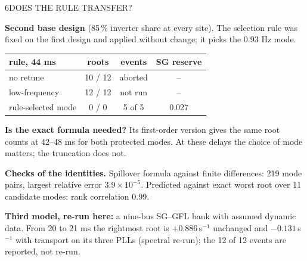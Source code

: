\begin{minipage}[t][\PosterMiddleRowHeight][t]{\PosterHalfWidth}\vspace{0pt}
  \begin{PosterPanel}{\PosterMiddleRowHeight}{6}{DOES THE RULE TRANSFER?}

    {\FigureSize\textbf{Second base design} (85\,\% inverter share at every site). The selection rule was fixed on the first design and applied without change; it picks the 0.93 Hz mode.\par}
    \vspace{1mm}
    \begin{center}\fontsize{26pt}{33pt}\selectfont
    \begin{tabular}{@{}lccc@{}}
    \textbf{rule, 44 ms} & \textbf{roots} & \textbf{events} & \textbf{SG reserve}\\\hline
    no retune & 10 / 12 & aborted & --\\
    low-frequency & 12 / 12 & not run & --\\
    rule-selected mode & 0 / 0 & 5 of 5 & 0.027\\
    \end{tabular}\end{center}
    \vspace{1mm}
    {\FigureSize\textbf{Is the exact formula needed?} Its first-order version gives the same root counts at 42--48 ms for both protected modes. At these delays the choice of mode matters; the truncation does not.\par}
    \vspace{2mm}
    {\FigureSize\textbf{Checks of the identities.} Spillover formula against finite differences: 219 mode pairs, largest relative error $3.9\times10^{-5}$. Predicted against exact worst root over 11 candidate modes: rank correlation 0.99.\par}
    \vspace{2mm}
    {\FigureSize\textbf{Third model, re-run here:} a nine-bus SG--GFL bank with assumed dynamic data. From 20 to 21 ms the rightmost root is $+0.886$\,s$^{-1}$ unchanged and $-0.131$\,s$^{-1}$ with transport on its three PLLs (spectral re-run); the 12 of 12 events are reported, not re-run.\par}

  \end{PosterPanel}
\end{minipage}%
